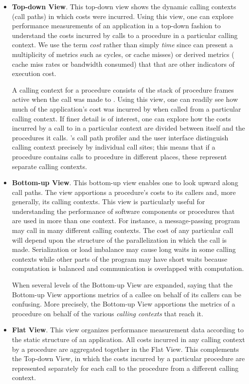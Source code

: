\begin{itemize}
\item \textbf{Top-down View}.
  This top-down view shows the dynamic calling contexts (call paths) in which costs were incurred.
  Using this view, one can explore performance measurements of an application in a top-down fashion to understand the costs incurred by calls to a procedure in a particular calling context.
  We use the term \emph{cost} rather than simply \emph{time} since \hpcviewer{} can present a multiplicity of metrics such as cycles, or cache misses) or derived metrics (\eg{} cache miss rates or bandwidth consumed) that that are other indicators of execution cost.

  A calling context for a procedure  consists of the stack of procedure frames active when the call was made to .
  Using this view, one can readily see how much of the application's cost was incurred by  when called from a particular calling context.
  If finer detail is of interest, one can explore how the costs incurred by a call to  in a particular context are divided between  itself and the procedures it calls.
  \HPCToolkit{}'s call path profiler \hpcrun{} and the \hpcviewer{} user interface distinguish calling context precisely by individual call sites; this means that if a procedure  contains calls to procedure  in different places, these represent separate calling contexts.

\item \textbf{Bottom-up View}.
  This bottom-up view enables one to look upward along call paths.
  The view apportions a procedure's costs to its callers and, more generally, its calling contexts.
  This view is particularly useful for understanding the performance of software components or procedures that are used in more than one context.
  For instance, a message-passing program may call  in many different calling contexts.
  The cost of any particular call will depend upon the structure of the parallelization in which the call is made.
  Serialization or load imbalance may cause long waits in some calling contexts while other parts of the program may have short waits because computation is balanced and communication is overlapped with computation.

  When several levels of the Bottom-up View are expanded, saying that the Bottom-up View apportions metrics of a callee on behalf of its callers can be confusing. More precisely, the Bottom-up View apportions the metrics of a procedure on behalf of the various \emph{calling contexts} that reach it.

\item \textbf{Flat View}.
  This view organizes performance measurement data according to the static structure of an application.
  All costs incurred in any calling context by a procedure are aggregated together in the Flat View.
  This complements the Top-down View, in which the costs incurred by a particular procedure are represented separately for each call to the procedure from a different calling context.

\end{itemize}


